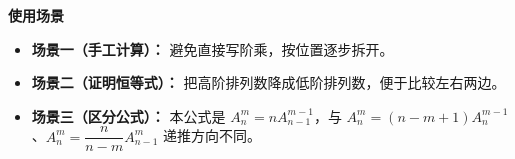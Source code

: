 \begin{explanationbox}
\medskip
\textbf{\textcolor{CExplanation}{使用场景}}
\begin{itemize}[leftmargin=*, itemsep=0.5em, topsep=0.4em]
    \item \textbf{场景一（手工计算）：} 避免直接写阶乘，按位置逐步拆开。
    \item \textbf{场景二（证明恒等式）：} 把高阶排列数降成低阶排列数，便于比较左右两边。
    \item \textbf{场景三（区分公式）：} 本公式是 $A_n^m=nA_{n-1}^{m-1}$，与 $A_n^m=(n-m+1)A_n^{m-1}$、$A_n^m=\dfrac{n}{n-m}A_{n-1}^{m}$ 递推方向不同。
\end{itemize}
\end{explanationbox}
